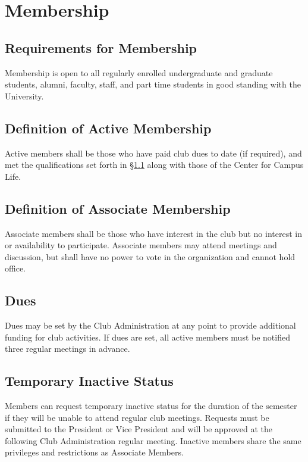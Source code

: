 \documentclass[english,11pt]{article}
\begin{document}
\section{Membership} \label{art:membership}
\subsection{Requirements for Membership} \label{sect:membership:requirements}
Membership is open to all regularly enrolled undergraduate and graduate students, alumni, faculty, staff, and part time students in good standing with the University.

\subsection{Definition of Active Membership} \label{sect:membership:active}
Active members shall be those who have paid club dues to date (if required), and met the qualifications set forth in §\ref{sect:membership:requirements} along with those of the Center for Campus Life.

\subsection{Definition of Associate Membership} \label{sect:membership:associate}
Associate members shall be those who have interest in the club but no interest in or availability to participate.
Associate members may attend meetings and discussion, but shall have no power to vote in the organization and cannot hold office.

\subsection{Dues} \label{sect:membership:dues}
Dues may be set by the Club Administration at any point to provide additional funding for club activities.
If dues are set, all active members must be notified three regular meetings in advance.

\subsection{Temporary Inactive Status} \label{sect:membership:tmp-inactive}
Members can request temporary inactive status for the duration of the semester if they will be unable to attend regular club meetings. 
Requests must be submitted to the President or Vice President and will be approved at the following Club Administration regular meeting.
Inactive members share the same privileges and restrictions as Associate Members.
\end{document}
